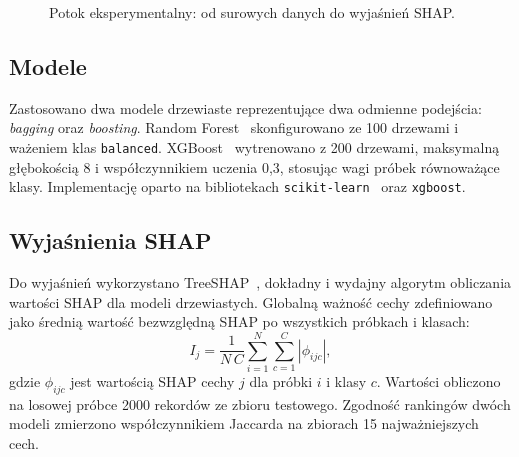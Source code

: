 \documentclass[conference]{IEEEtran}
\begin{document}
\begin{figure}[t]
\centering
{}
\caption{Potok eksperymentalny: od surowych danych do wyjaśnień SHAP.}
\label{fig:pipeline}
\end{figure}

\subsection{Modele}
Zastosowano dwa modele drzewiaste reprezentujące dwa odmienne podejścia: \emph{bagging} oraz \emph{boosting}. Random Forest~\cite{breiman2001rf} skonfigurowano ze 100 drzewami i ważeniem klas \texttt{balanced}. XGBoost~\cite{chen2016xgboost} wytrenowano z 200 drzewami, maksymalną głębokością 8 i współczynnikiem uczenia 0,3, stosując wagi próbek równoważące klasy. Implementację oparto na bibliotekach \texttt{scikit-learn}~\cite{pedregosa2011scikit} oraz \texttt{xgboost}.

\subsection{Wyjaśnienia SHAP}
Do wyjaśnień wykorzystano TreeSHAP~\cite{lundberg2020treeshap}, dokładny i wydajny algorytm obliczania wartości SHAP dla modeli drzewiastych. Globalną ważność cechy zdefiniowano jako średnią wartość bezwzględną SHAP po wszystkich próbkach i klasach:
\begin{equation}
I_j = \frac{1}{N\,C}\sum_{i=1}^{N}\sum_{c=1}^{C}\left|\phi_{ijc}\right|,
\end{equation}
gdzie $\phi_{ijc}$ jest wartością SHAP cechy $j$ dla próbki $i$ i klasy $c$. Wartości obliczono na losowej próbce 2000 rekordów ze zbioru testowego. Zgodność rankingów dwóch modeli zmierzono współczynnikiem Jaccarda na zbiorach 15 najważniejszych cech.
\end{document}
